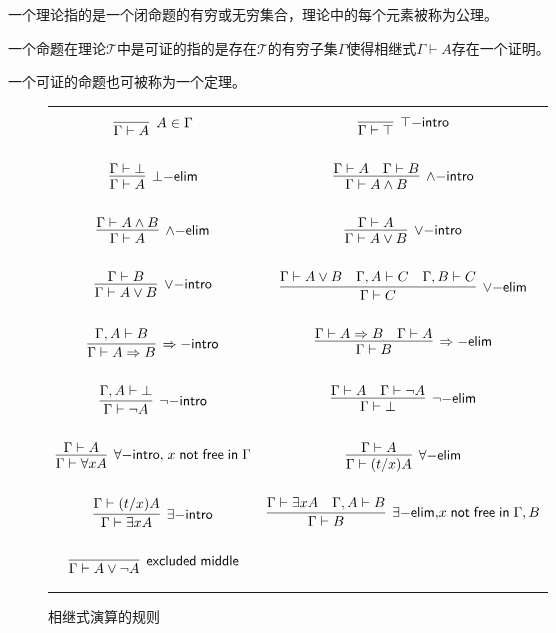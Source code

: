 \begin{definition}[理论]
	一个理论指的是一个闭命题的有穷或无穷集合，理论中的每个元素被称为公理。
\end{definition}
\begin{definition}[可证的命题]
	一个命题在理论$\mathcal{T}$中是可证的指的是存在$\mathcal{T}$的有穷子集$\Gamma$使得相继式$\Gamma\vdash A$存在一个证明。
	
	一个可证的命题也可被称为一个定理。
\end{definition}
\begin{figure}[!h]
	\centering
		\small
		\caption{相继式演算的规则}
		\label{preliminary:sequent:calculus}
		\renewcommand\arraystretch{1.7}
			\begin{tabular}{|ll|}
			\hline
			$$
			\infer[A\in\Gamma]{\Gamma\vdash A}{}
			$$
			&
			$$
			\infer[\top\mathsf{-intro}]{\Gamma\vdash\top}{}
			$$\\
			$$
			\infer[\bot\mathsf{-elim}]{\Gamma\vdash A}{\Gamma\vdash \bot}
			$$
			&
			$$
			\infer[\wedge\mathsf{-intro}]{\Gamma\vdash A\wedge B}{\Gamma\vdash A & \Gamma\vdash B}
			$$\\
			$$
			\infer[\wedge\mathsf{-elim}]{\Gamma\vdash A}{\Gamma\vdash A\wedge B}
			$$
			&
			$$
			\infer[\vee\mathsf{-intro}]{\Gamma\vdash A\vee B}{\Gamma\vdash A}
			$$\\
			$$
			\infer[\vee\mathsf{-intro}]{\Gamma\vdash A\vee B}{\Gamma\vdash B}
			$$
			&
			$$
			\infer[\vee\mathsf{-elim}]{\Gamma\vdash C}{\Gamma\vdash A\vee B & \Gamma,A\vdash C & \Gamma, B\vdash C}
			$$\\
			$$
			\infer[\Rightarrow\mathsf{-intro}]{\Gamma\vdash A\Rightarrow B}{\Gamma, A\vdash B}
			$$
			&
			$$
			\infer[\Rightarrow\mathsf{-elim}]{\Gamma\vdash B}{\Gamma\vdash A\Rightarrow B & \Gamma\vdash A}
			$$\\
			$$
			\infer[\neg\mathsf{-intro}]{\Gamma\vdash\neg A}{\Gamma,A\vdash \bot}
			$$
			&
			$$
			\infer[\neg\mathsf{-elim}]{\Gamma\vdash \bot}{\Gamma\vdash A & \Gamma\vdash \neg A}
			$$\\
			$$
			\infer[{\forall\mathsf{-intro},}\;{x\;\mathsf{not}\;\mathsf{free}\;\mathsf{in}\;\Gamma}]{\Gamma\vdash\forall x A}{\Gamma\vdash A}
			$$
			&
			$$
			\infer[\forall\mathsf{-elim}]{\Gamma\vdash (t/x)A}{\Gamma\vdash A}
			$$\\
			$$
			\infer[\exists\mathsf{-intro}]{\Gamma\vdash\exists x A}{\Gamma\vdash (t/x)A}
			$$
			&
			$$
			\infer[\exists\mathsf{-elim,}x\;\mathsf{not}\;\mathsf{free}\;\mathsf{in}\;\Gamma,B]{\Gamma\vdash B}{\Gamma\vdash\exists x A & \Gamma,A\vdash B}
			$$\\
			$$
			\infer[\mathsf{excluded}\;\mathsf{middle}]{\Gamma\vdash A\vee\neg A}{}
			$$&{}
			\\
			\hline
		\end{tabular}
	
\end{figure}

